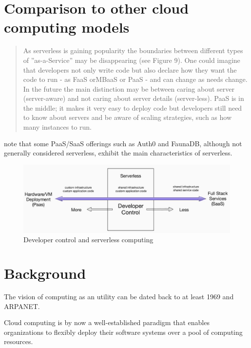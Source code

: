 \documentclass[utf8,english]{gradu3}
\begin{document}
\section{Comparison to other cloud computing models}

\begin{quote}
As serverless is gaining popularity the boundaries between different types of ”as-a-Service” may be disappearing (see Figure 9). One could imagine that developers not only write code but also declare how they want the code to run - as FaaS orMBaaS or PaaS - and can change as needs change. In the future the main distinction may be between caring about server (server-aware) and not caring about server details (server-less). PaaS is in the middle; it makes it very easy to deploy code but developers still need to know about servers and be aware of scaling strategies, such as how many instances to run. \parencite{baldini17currentTrends}
\end{quote}

\textcite{van2017spec} note that some PaaS/SaaS offerings such as Auth0 and FaunaDB, although not generally considered serverless, exhibit the main characteristics of serverless.

\begin{figure}[h]
  \centering
  \includegraphics[width=\textwidth]{baldini17-paas-faas-saas.jpg}
  \caption{Developer control and serverless computing \parencite{baldini17currentTrends}}
\end{figure}

\section{Background}

The vision of computing as an utility can be dated back to at least 1969 and ARPANET. \parencite{buyya09cloud}

Cloud computing is by now a well-established paradigm that enables organizations to flexibly deploy their software systems over a pool of computing resources.  \parencite{jamshidi13cloudmigrationreview}
\end{document}
